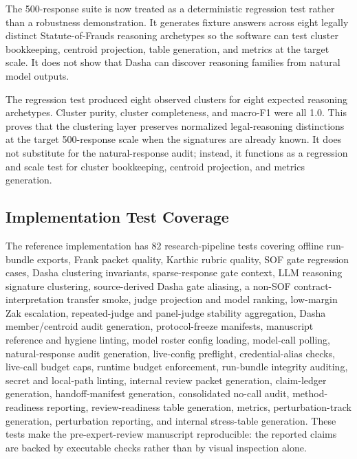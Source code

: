 The 500-response suite is now treated as a deterministic regression test rather
than a robustness demonstration. It generates fixture answers across eight
legally distinct Statute-of-Frauds reasoning archetypes so the software can test
cluster bookkeeping, centroid projection, table generation, and metrics at the
target scale. It does not show that Dasha can discover reasoning families from
natural model outputs.

\begin{table}[h]
\centering
\caption{Controlled Dasha clustering regression test.}
\label{tab:stress-validation}

\end{table}

The regression test produced eight observed clusters for eight expected reasoning
archetypes. Cluster purity, cluster completeness, and macro-F1 were all 1.0.
This proves that the clustering layer preserves normalized legal-reasoning
distinctions at the target 500-response scale when the signatures are already
known. It does not substitute for the natural-response audit; instead, it
functions as a regression and scale test for cluster bookkeeping, centroid
projection, and metrics generation.

\subsection{Implementation Test Coverage}

The reference implementation has 82 research-pipeline tests covering offline run-bundle
exports, Frank packet quality, Karthic rubric quality, SOF gate regression
cases, Dasha clustering invariants, sparse-response gate context, LLM reasoning
signature clustering, source-derived Dasha gate aliasing, a non-SOF
contract-interpretation transfer smoke, judge projection and model ranking,
low-margin Zak escalation, repeated-judge and panel-judge stability aggregation,
Dasha member/centroid audit generation, protocol-freeze manifests, manuscript reference and hygiene linting, model roster config loading, model-call polling, natural-response audit
generation, live-config preflight, credential-alias checks, live-call budget caps, runtime budget enforcement, run-bundle integrity auditing, secret and local-path linting, internal review packet generation, claim-ledger generation, handoff-manifest generation, consolidated no-call audit, method-readiness reporting, review-readiness table generation, metrics, perturbation-track generation, perturbation reporting, and
internal stress-table generation. These tests make the pre-expert-review
manuscript reproducible: the reported claims are backed by executable checks
rather than by visual inspection alone.
